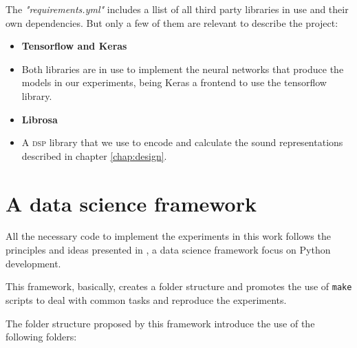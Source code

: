 The {\it "requirements.yml"} includes a llist of all third party libraries in use and their own dependencies. But only a few of them are relevant to describe the project:

\begin{itemize}
  \item {{\bf Tensorflow and Keras}}
  \item []{
    Both libraries are in use to implement the neural networks that produce the models in our experiments, being Keras a frontend to use the tensorflow library.
  }
  \item {{\bf Librosa \citep{librosa}}}
  \item [ ]{
    A \textsc{\textsc{dsp}} library that we use to encode and calculate the sound representations described in chapter \ref{chap:design}.
  }
\end{itemize}

\section{A data science framework}

All the necessary code to implement the experiments in this work follows the principles and ideas presented in \citet{cookiecutter}, a data science framework focus on Python development.

This framework, basically, creates a folder structure and promotes the use of \texttt{make} scripts to deal with common tasks and reproduce the experiments.

The folder structure proposed by this framework introduce the use of the following folders:


